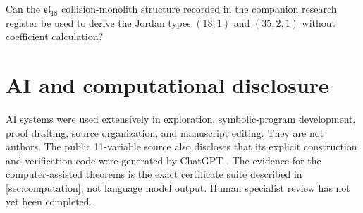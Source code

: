 \documentclass[11pt,reqno]{amsart}
\begin{document}
\begin{question}
Can the \(\mathfrak{sl}_{18}\) collision-monolith structure recorded in the
companion research register be used to derive the Jordan types
\((18,1)\) and \((35,2,1)\) without coefficient calculation?
\end{question}

\appendix




\section*{AI and computational disclosure}

AI systems were used extensively in exploration, symbolic-program
development, proof drafting, source organization, and manuscript editing.
They are not authors.  The public 11-variable source also discloses that its
explicit construction and verification code were generated by ChatGPT
\cite{atkinsTurkish2026}.  The evidence for the computer-assisted theorems is
the exact certificate suite described in \cref{sec:computation}, not language
model output.  Human specialist review has not yet been completed.



\end{document}
